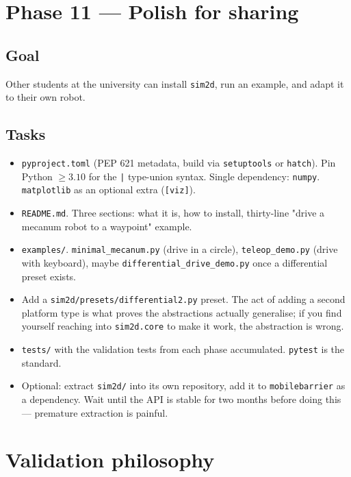 \documentclass[11pt,a4paper]{article}
\newcommand{\code}[1]{\texttt{\small #1}}
\newcommand{\file}[1]{\texttt{\small #1}}
\begin{document}
\section{Phase 11 --- Polish for sharing}
\label{sec:polish}

\subsection*{Goal}
Other students at the university can install \code{sim2d}, run an example,
and adapt it to their own robot.

\subsection*{Tasks}

\begin{itemize}
    \item \file{pyproject.toml} (PEP 621 metadata, build via
        \code{setuptools} or \code{hatch}). Pin Python $\ge 3.10$ for the
        \code{|} type-union syntax. Single dependency: \code{numpy}.
        \code{matplotlib} as an optional extra
        (\code{[viz]}).
    \item \file{README.md}. Three sections: what it is, how to install,
        thirty-line "drive a mecanum robot to a waypoint" example.
    \item \file{examples/}. \code{minimal\_mecanum.py} (drive in a
        circle), \code{teleop\_demo.py} (drive with keyboard), maybe
        \code{differential\_drive\_demo.py} once a differential preset
        exists.
    \item Add a \file{sim2d/presets/differential2.py} preset. The act of
        adding a second platform type is what proves the abstractions
        actually generalise; if you find yourself reaching into
        \code{sim2d.core} to make it work, the abstraction is wrong.
    \item \file{tests/} with the validation tests from each phase
        accumulated. \code{pytest} is the standard.
    \item Optional: extract \code{sim2d/} into its own repository, add it
        to \code{mobilebarrier} as a dependency. Wait until the API is
        stable for two months before doing this --- premature extraction
        is painful.
\end{itemize}

\section{Validation philosophy}
\end{document}
